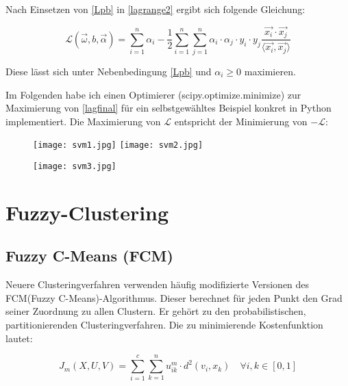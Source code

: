 \documentclass[11pt,ceqn]{book}
\begin{document}
Nach Einsetzen von \eqref{Lpb} in \eqref{lagrange2} ergibt sich folgende Gleichung:

\begin{equation} \label{lagfinal}
\mathcal{L}(\vec{\omega},b,\vec{\alpha}) = \sum_{i=1}^n \alpha_i - \frac{1}{2} \sum_{i=1}^n \sum_{j=1}^n \alpha_i \cdot \alpha_j \cdot y_i \cdot y_j \frac{\vec{x_i} \cdot \vec{x_j}}{ \langle \vec{x_i},  \vec{x_j} \rangle}
\end{equation}

Diese lässt sich unter Nebenbedingung \eqref{Lpb} und $\alpha_i \geqslant 0$ maximieren.

\vspace*{\fill}

Im Folgenden habe ich einen Optimierer (scipy.optimize.minimize) zur Maximierung von \eqref{lagfinal} für ein selbstgewähltes Beispiel konkret in Python implementiert. Die Maximierung von $\mathcal{L}$ entspricht der Minimierung von $-\mathcal{L}$:


\begin{figure}[H]
\centering
\texttt{[image: svm1.jpg]}
\texttt{[image: svm2.jpg]}
\end{figure}
\begin{figure}[H]
\centering
\texttt{[image: svm3.jpg]}
\end{figure}

\hfill

\section{Fuzzy-Clustering}

\subsection{Fuzzy C-Means (FCM)}
Neuere Clusteringverfahren verwenden häufig modifizierte Versionen des FCM(Fuzzy C-Means)-Algorithmus\cite{clustgis}. Dieser berechnet für jeden Punkt den Grad seiner Zuordnung zu allen Clustern. Er gehört zu den probabilistischen, partitionierenden Clusteringverfahren.
Die zu minimierende Kostenfunktion lautet:

$$J_m(X,U,V) = \sum_{i=1}^{c} \sum_{k=1}^{n} u_{ik}^m \cdot d^2(v_i,x_k) \quad \forall i,k \in [0,1]$$
\end{document}
